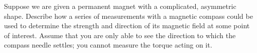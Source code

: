         Suppose we are given a permanent magnet with a
        complicated, asymmetric shape. Describe how a series of
        measurements with a magnetic compass could be used to
        determine the strength and direction of its magnetic field
        at some point of interest. Assume that you are only able to
        see the direction to which the compass needle settles; you
        cannot measure the torque acting on it.
